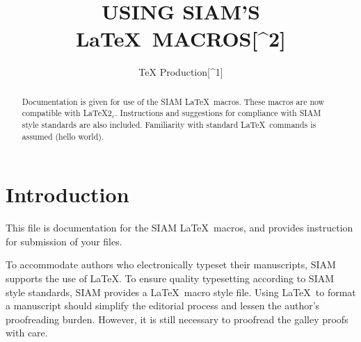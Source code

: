 \documentclass[]{siamltex}
\title{USING SIAM'S LaTeX~MACROS{[}\^{}2{]}}
\author{TeX Production{[}\^{}1{]}}
\date{}
\begin{document}
\maketitle
\begin{abstract}
Documentation is given for use of the SIAM LaTeX~macros. These macros
are now compatible with LaTeX\(2_{\varepsilon}\). Instructions and
suggestions for compliance with SIAM style standards are also included.
Familiarity with standard LaTeX~commands is assumed (hello world).
\end{abstract}

\section{Introduction}\label{introduction}

This file is documentation for the SIAM LaTeX~macros, and provides
instruction for submission of your files.

To accommodate authors who electronically typeset their manuscripts,
SIAM supports the use of LaTeX. To ensure quality typesetting according
to SIAM style standards, SIAM provides a LaTeX~macro style file. Using
LaTeX~to format a manuscript should simplify the editorial process and
lessen the author's proofreading burden. However, it is still necessary
to proofread the galley proofs with care.
\end{document}
